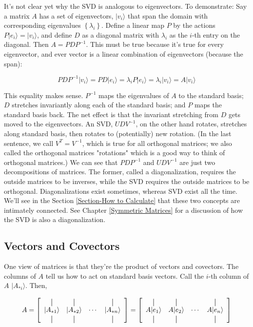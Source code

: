 \documentclass{amsbook}
\newcommand*{\vertbar}{\rule[-1ex]{0.5pt}{2.5ex}}
\begin{document}
It's not clear yet why the SVD is analogous to eigenvectors.  To demonstrate:  Say a matrix $A$ has a set of eigenvectors, $|v_i\rangle$ that span the domain with corresponding eigenvalues $\left\{\lambda_i\right\}$.  Define a linear map $P$ by the actions $P|e_i\rangle=|v_i\rangle$, and define $D$ as a diagonal matrix with $\lambda_i$ as the $i$-th entry on the diagonal.  Then $A=PDP^{-1}$.  This must be true because it's true for every eigenvector, and ever vector is a linear combination of eigenvectors (because the span):

$$
PDP^{-1}|v_i\rangle = PD|e_i\rangle = \lambda_iP|e_i\rangle = \lambda_i|v_i\rangle = A|v_i\rangle
$$

This equality makes sense.  $P^{-1}$ maps the eigenvalues of $A$ to the standard basis; $D$ stretches invariantly along each of the standard basis; and $P$ maps the standard basis back.  The net effect is that the invariant stretching from $D$ gets moved to the eigenvectors.  An SVD, $UDV^{-1}$, on the other hand rotates, stretches along standard basis, then rotates to (potentially) new rotation.  (In the last sentence, we call $V^T=V^{-1}$, which is true for all orthogonal matrices; we also called the orthogonal matrices "rotations" which is a good way to think of orthogonal matrices.)  We can see that $PDP^{-1}$ and $UDV^{-1}$ are just two decompositions of matrices.  The former, called a diagonalization, requires the outside matrices to be inverses, while the SVD requires the outside matrices to be orthogonal.  Diagonalizations exist sometimes, whereas SVD exist all the time.  We'll see in the Section \ref{Section-How to Calculate} that these two concepts are intimately connected.  See Chapter \ref{Symmetric Matrices} for a discussion of how the SVD is also a diagonalization.

\subsection{Vectors and Covectors}\label{SectionVecsAndCovecs}

One view of matrices is that they're the product of vectors and covectors.  The columns of $A$ tell us how to act on standard basis vectors.  Call the $i$-th column of $A$ $|A_{*i}\rangle$.  Then,

$$
A = 
\left[
  \begin{array}{cccc}
    \vertbar & \vertbar & & \vertbar \\
    |A_{*1}\rangle  & |A_{*2}\rangle & \cdots & |A_{*n}\rangle \\
    \vertbar & \vertbar & & \vertbar 
  \end{array}
\right] =
\left[
  \begin{array}{cccc}
    \vertbar & \vertbar & & \vertbar \\
    A|e_1\rangle    & A|e_2\rangle   & \cdots & A|e_n\rangle    \\
    \vertbar & \vertbar & & \vertbar 
  \end{array}
\right]
$$
\end{document}
